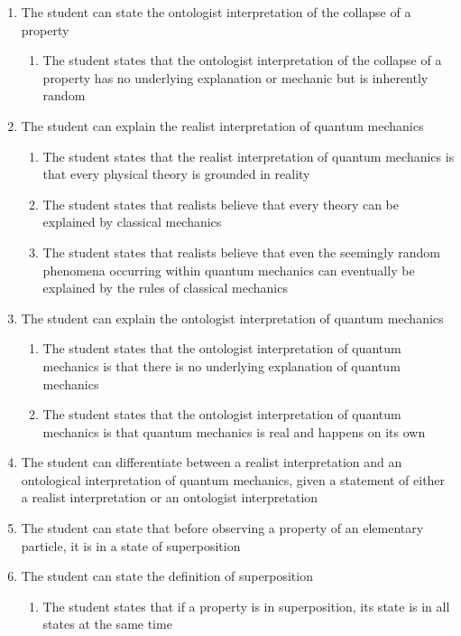 \documentclass[11pt,twoside]{report} %
\begin{document}
\begin{enumerate}
\begin{enumerate}
\end{enumerate}
\item The student can state the ontologist interpretation of the collapse of a property
\begin{enumerate}
\item The student states that the ontologist interpretation of the collapse of a property has no underlying explanation or mechanic but is inherently random
\end{enumerate}
\item The student can explain the realist interpretation of quantum mechanics
\begin{enumerate}
\item The student states that the realist interpretation of quantum mechanics is that every physical theory is grounded in reality
\item The student states that realists believe that every theory can be explained by classical mechanics
\item The student states that realists believe that even the seemingly random phenomena occurring within quantum mechanics can eventually be explained by the rules of classical mechanics
\end{enumerate}
\item The student can explain the ontologist interpretation of quantum mechanics
\begin{enumerate}
\item The student states that the ontologist interpretation of quantum mechanics is that there is no underlying explanation of quantum mechanics
\item The student states that the ontologist interpretation of quantum mechanics is that quantum mechanics is real and happens on its own
\end{enumerate}
\item The student can differentiate between a realist interpretation and an ontological interpretation of quantum mechanics, given a statement of either a realist interpretation or an ontologist interpretation
\item The student can state that before observing a property of an elementary particle, it is in a state of superposition
\item The student can state the definition of superposition
\begin{enumerate}
\item The student states that if a property is in superposition, its state is in all states at the same time
\end{enumerate}

\end{enumerate}
\end{document}
